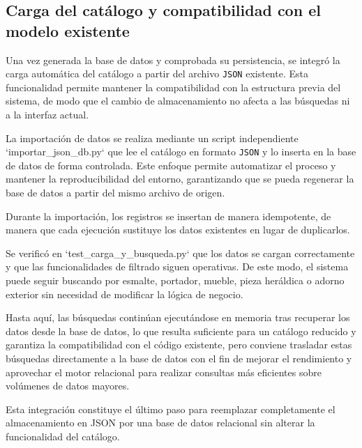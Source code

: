 \subsection{Carga del catálogo y compatibilidad con el modelo existente}
Una vez generada la base de datos y comprobada su persistencia, se integró la carga automática del catálogo a partir del 
archivo \texttt{JSON} existente. Esta funcionalidad permite mantener la compatibilidad con la estructura previa del sistema, 
de modo que el cambio de almacenamiento no afecta a las búsquedas ni a la interfaz actual.

La importación de datos se realiza mediante un script independiente `importar_json_db.py` que lee el catálogo en 
formato \texttt{JSON} y lo inserta en la base de datos de forma controlada. Este enfoque permite automatizar el proceso y 
mantener la reproducibilidad del entorno, garantizando que se pueda regenerar la base de datos a partir del mismo archivo de 
origen.

Durante la importación, los registros se insertan de manera idempotente, de manera que cada ejecución sustituye los datos 
existentes en lugar de duplicarlos. 

Se verificó en `test_carga_y_busqueda.py` que los datos se cargan correctamente y que las funcionalidades de filtrado 
siguen operativas. De este modo, el sistema puede seguir buscando por esmalte, portador, mueble, pieza heráldica o adorno 
exterior sin necesidad de modificar la lógica de negocio.

Hasta aquí, las búsquedas continúan ejecutándose en memoria tras recuperar los datos desde la base de datos, lo que resulta 
suficiente para un catálogo reducido y garantiza la compatibilidad con el código existente, pero conviene trasladar estas 
búsquedas directamente a la base de datos con el fin de mejorar el rendimiento y aprovechar el motor relacional para realizar 
consultas más eficientes sobre volúmenes de datos mayores.

Esta integración constituye el último paso para reemplazar completamente el almacenamiento en JSON por una base de datos 
relacional sin alterar la funcionalidad del catálogo.